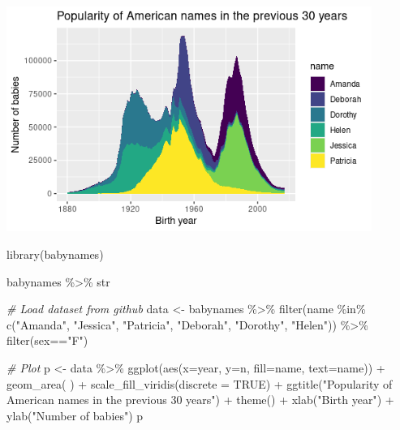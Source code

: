 \documentclass[
]{book}
\newenvironment{Shaded}{\begin{snugshade}}{\end{snugshade}}
\newcommand{\AttributeTok}[1]{\textcolor[rgb]{0.77,0.63,0.00}{#1}}
\newcommand{\CommentTok}[1]{\textcolor[rgb]{0.56,0.35,0.01}{\textit{#1}}}
\newcommand{\ConstantTok}[1]{\textcolor[rgb]{0.00,0.00,0.00}{#1}}
\newcommand{\FunctionTok}[1]{\textcolor[rgb]{0.00,0.00,0.00}{#1}}
\newcommand{\NormalTok}[1]{#1}
\newcommand{\OtherTok}[1]{\textcolor[rgb]{0.56,0.35,0.01}{#1}}
\newcommand{\SpecialCharTok}[1]{\textcolor[rgb]{0.00,0.00,0.00}{#1}}
\newcommand{\StringTok}[1]{\textcolor[rgb]{0.31,0.60,0.02}{#1}}
\begin{document}
\includegraphics[width=4.6875in,height=\textheight]{images/10/000009a.png}

\begin{Shaded}
\begin{Highlighting}[]
\FunctionTok{library}\NormalTok{(babynames)}

\NormalTok{babynames }\SpecialCharTok{\%\textgreater{}\%}\NormalTok{ str}


\CommentTok{\# Load dataset from github}
\NormalTok{data }\OtherTok{\textless{}{-}}\NormalTok{ babynames }\SpecialCharTok{\%\textgreater{}\%} 
  \FunctionTok{filter}\NormalTok{(name }\SpecialCharTok{\%in\%} \FunctionTok{c}\NormalTok{(}\StringTok{"Amanda"}\NormalTok{, }\StringTok{"Jessica"}\NormalTok{,    }\StringTok{"Patricia"}\NormalTok{, }\StringTok{"Deborah"}\NormalTok{,   }\StringTok{"Dorothy"}\NormalTok{,  }\StringTok{"Helen"}\NormalTok{)) }\SpecialCharTok{\%\textgreater{}\%}
  \FunctionTok{filter}\NormalTok{(sex}\SpecialCharTok{==}\StringTok{"F"}\NormalTok{)}

\CommentTok{\# Plot}
\NormalTok{p }\OtherTok{\textless{}{-}}\NormalTok{ data }\SpecialCharTok{\%\textgreater{}\%} 
  \FunctionTok{ggplot}\NormalTok{(}\FunctionTok{aes}\NormalTok{(}\AttributeTok{x=}\NormalTok{year, }\AttributeTok{y=}\NormalTok{n, }\AttributeTok{fill=}\NormalTok{name, }\AttributeTok{text=}\NormalTok{name)) }\SpecialCharTok{+}
    \FunctionTok{geom\_area}\NormalTok{( ) }\SpecialCharTok{+}
    \FunctionTok{scale\_fill\_viridis}\NormalTok{(}\AttributeTok{discrete =} \ConstantTok{TRUE}\NormalTok{) }\SpecialCharTok{+}
    \FunctionTok{ggtitle}\NormalTok{(}\StringTok{"Popularity of American names in the previous 30 years"}\NormalTok{) }\SpecialCharTok{+}
    \FunctionTok{theme}\NormalTok{() }\SpecialCharTok{+}
    \FunctionTok{xlab}\NormalTok{(}\StringTok{"Birth year"}\NormalTok{) }\SpecialCharTok{+}
    \FunctionTok{ylab}\NormalTok{(}\StringTok{"Number of babies"}\NormalTok{)}
\NormalTok{p}
\end{Highlighting}
\end{Shaded}
\end{document}
